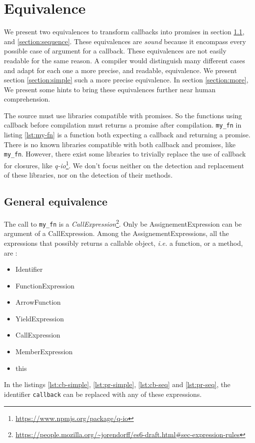 \section{Equivalence}

We present two equivalences to transform callbacks into promises in section \ref{section:general}, and \ref{section:sequence}.
These equivalences are \textit{sound} because it encompass every possible case of argument for a callback.
These equivalences are not easily readable for the same reason.
A compiler would distinguish many different cases and adapt for each one a more precise, and readable, equivalence.
We present section \ref{section:simple} such a more precise equivalence.
In section \ref{section:more}, We present some hints to bring these equivalences further near human comprehension.

The source must use libraries compatible with promises.
So the functions using callback before compilation must returns a promise after compilation.
\texttt{my_fn} in listing \ref{lst:my-fn} is a function both expecting a callback and returning a promise.
There is no known libraries compatible with both callback and promises, like \texttt{my_fn}.
However, there exist some libraries to trivially replace the use of callback for closures, like \textit{q-io}\footnote{\url{https://www.npmjs.org/package/q-io}}.
We don't focus neither on the detection and replacement of these libraries, nor on the detection of their methods.


\subsection{General equivalence} \label{section:general}

The call to \texttt{my_fn} is a \textit{CallExpression}\footnote{\url{https://people.mozilla.org/~jorendorff/es6-draft.html\#sec-expression-rules}}.
Only be AssignementExpression can be argument of a CallExpression.
Among the AssignementExpressions, all the expressions that possibly returns a callable object, \textit{i.e.} a function, or a method, are :
\begin{itemize}
\item Identifier
\item FunctionExpression
\item ArrowFunction
\item YieldExpression
\item CallExpression
\item MemberExpression
\item this
\end{itemize}
In the listings \ref{lst:cb-simple}, \ref{lst:pr-simple}, \ref{lst:cb-seq} and \ref{lst:pr-seq}, the identifier \texttt{callback} can be replaced with any of these expressions.

